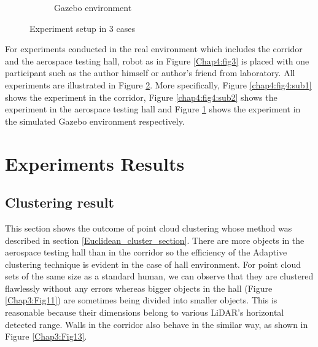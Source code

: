 \begin{figure}[!htb]
\begin{subfigure}{\linewidth}
        \caption{Gazebo environment}
        \label{chap4:fig4:sub3}
        \end{subfigure}
    \caption{Experiment setup in 3 cases}
    \label{Chap4:fig4}
\end{figure}


For experiments conducted in the real environment which includes
the corridor and the aerospace testing hall, robot as in Figure \ref{Chap4:fig3} is 
placed with one participant such as the author himself or author's
friend from laboratory. All experiments are illustrated in Figure \ref{Chap4:fig4}. 
More specifically, Figure \ref{chap4:fig4:sub1} shows the experiment in the corridor, Figure
\ref{chap4:fig4:sub2} shows the experiment in the aerospace testing hall and Figure 
\ref{chap4:fig4:sub3} shows the experiment in the simulated Gazebo environment respectively.

\clearpage

\section{Experiments Results}
\label{Exp_result}

\subsection{Clustering result}
\label{cluster_result}

This section shows the outcome of point cloud clustering whose method was described in section \ref{Euclidean_cluster_section}.
There are more objects in the aerospace testing hall than in the corridor so the efficiency of the Adaptive clustering technique
is evident in the case of hall environment. For point cloud sets of the same size as a standard human,
we can observe that they are clustered flawlessly without any errors whereas bigger objects in the hall (Figure \ref{Chap3:Fig11})
are sometimes being divided into smaller objects. This is reasonable because their dimensions
belong to various LiDAR's horizontal detected range. Walls in the corridor also behave in the similar 
way, as shown in Figure \ref{Chap3:Fig13}. 

